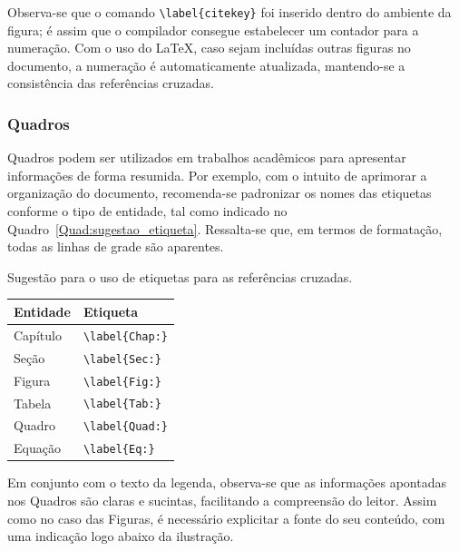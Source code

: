 \documentclass[
	12pt,				%
	oneside,			%
	a4paper,			%
	chapter=TITLE,		%
	section=TITLE,		%
	english,			%
	brazil,				%
	]{abntex2}
\begin{document}
\begin{apendicesenv}
    Observa-se que o comando \verb|\label{citekey}| foi inserido dentro do ambiente da figura; é assim que o compilador consegue estabelecer um contador para a numeração.
    Com o uso do \LaTeX, caso sejam incluídas outras figuras no documento, a numeração é automaticamente atualizada, mantendo-se a consistência das referências cruzadas.

    \subsubsection{Quadros}
    \label{Sec:ref_quadros}

    Quadros podem ser utilizados em trabalhos acadêmicos para apresentar informações de forma resumida.
    Por exemplo, com o intuito de aprimorar a organização do documento, recomenda-se padronizar os nomes das etiquetas conforme o tipo de entidade, tal como indicado no Quadro~\ref{Quad:sugestao_etiqueta}.
    Ressalta-se que, em termos de formatação, todas as linhas de grade são aparentes.

    \begin{quadro}[htb]
        \centering
        \caption{Sugestão para o uso de etiquetas para as referências cruzadas.}
        \label{tab:my-table}
        \begin{tabular}{|l|l|}
            \hline
            Entidade & Etiqueta             \\ \hline
            Capítulo & \verb|\label{Chap:}| \\ \hline
            Seção    & \verb|\label{Sec:}|  \\ \hline
            Figura   & \verb|\label{Fig:}|  \\ \hline
            Tabela   & \verb|\label{Tab:}|  \\ \hline
            Quadro   & \verb|\label{Quad:}| \\ \hline
            Equação  & \verb|\label{Eq:}|   \\ \hline
        \end{tabular}
        \label{Quad:sugestao_etiqueta}
    \end{quadro}

    Em conjunto com o texto da legenda, observa-se que as informações apontadas nos Quadros são claras e sucintas, facilitando a compreensão do leitor.
    Assim como no caso das Figuras, é necessário explicitar a fonte do seu conteúdo, com uma indicação logo abaixo da ilustração.


\end{apendicesenv}
\end{document}
